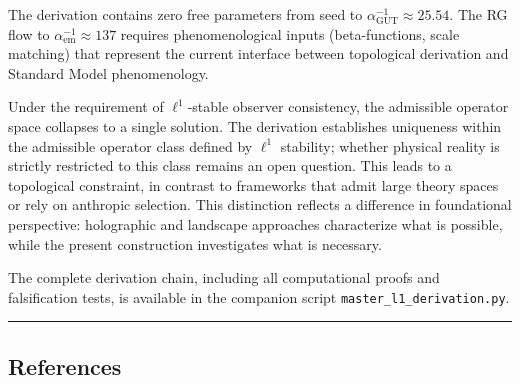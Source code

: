 \documentclass[
]{article}
\begin{document}
The derivation contains zero free parameters from seed to
\(\alpha_{\mathrm{GUT}}^{-1} \approx 25.54\). The RG flow to
\(\alpha_{\mathrm{em}}^{-1} \approx 137\) requires phenomenological
inputs (beta-functions, scale matching) that represent the current
interface between topological derivation and Standard Model
phenomenology.

Under the requirement of \(\ell^1\)-stable observer consistency, the
admissible operator space collapses to a single solution. The derivation
establishes uniqueness within the admissible operator class defined by
\(\ell^1\) stability; whether physical reality is strictly restricted to
this class remains an open question. This leads to a topological
constraint, in contrast to frameworks that admit large theory spaces or
rely on anthropic selection. This distinction reflects a difference in
foundational perspective: holographic and landscape approaches
characterize what is possible, while the present construction
investigates what is necessary.

The complete derivation chain, including all computational proofs and
falsification tests, is available in the companion script
\texttt{master\_l1\_derivation.py}.

\begin{center}\rule{0.5\linewidth}{0.5pt}\end{center}

\hypertarget{references}{%
\subsection{References}\label{references}}
\end{document}
